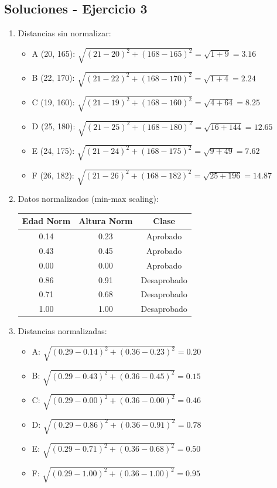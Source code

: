 \documentclass[12pt]{article}
\begin{document}
\subsection{Soluciones - Ejercicio 3}

\begin{enumerate}
    \item Distancias sin normalizar:
    \begin{itemize}
        \item A (20, 165): $\sqrt{(21-20)^2 + (168-165)^2} = \sqrt{1 + 9} = 3.16$
        \item B (22, 170): $\sqrt{(21-22)^2 + (168-170)^2} = \sqrt{1 + 4} = 2.24$
        \item C (19, 160): $\sqrt{(21-19)^2 + (168-160)^2} = \sqrt{4 + 64} = 8.25$
        \item D (25, 180): $\sqrt{(21-25)^2 + (168-180)^2} = \sqrt{16 + 144} = 12.65$
        \item E (24, 175): $\sqrt{(21-24)^2 + (168-175)^2} = \sqrt{9 + 49} = 7.62$
        \item F (26, 182): $\sqrt{(21-26)^2 + (168-182)^2} = \sqrt{25 + 196} = 14.87$
    \end{itemize}
    
    \item Datos normalizados (min-max scaling):
    \begin{table}[H]
        \centering
        \begin{tabular}{ccc}
            \toprule
            \textbf{Edad Norm} & \textbf{Altura Norm} & \textbf{Clase} \\
            \midrule
            0.14 & 0.23 & Aprobado \\
            0.43 & 0.45 & Aprobado \\
            0.00 & 0.00 & Aprobado \\
            0.86 & 0.91 & Desaprobado \\
            0.71 & 0.68 & Desaprobado \\
            1.00 & 1.00 & Desaprobado \\
            \bottomrule
        \end{tabular}
    \end{table}
    
    \item Distancias normalizadas:
    \begin{itemize}
        \item A: $\sqrt{(0.29-0.14)^2 + (0.36-0.23)^2} = 0.20$
        \item B: $\sqrt{(0.29-0.43)^2 + (0.36-0.45)^2} = 0.15$
        \item C: $\sqrt{(0.29-0.00)^2 + (0.36-0.00)^2} = 0.46$
        \item D: $\sqrt{(0.29-0.86)^2 + (0.36-0.91)^2} = 0.78$
        \item E: $\sqrt{(0.29-0.71)^2 + (0.36-0.68)^2} = 0.50$
        \item F: $\sqrt{(0.29-1.00)^2 + (0.36-1.00)^2} = 0.95$
    \end{itemize}
    

\end{enumerate}
\end{document}
